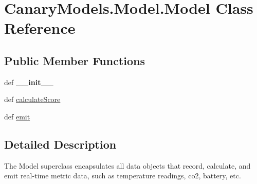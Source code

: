 \hypertarget{class_canary_models_1_1_model_1_1_model}{\section{Canary\-Models.\-Model.\-Model Class Reference}
\label{class_canary_models_1_1_model_1_1_model}
}
\subsection*{Public Member Functions}
\begin{DoxyCompactItemize}
\item 
\hypertarget{class_canary_models_1_1_model_1_1_model_a3125982406bc3fb9edd8695282c40170}{def {\bfseries \-\_\-\-\_\-init\-\_\-\-\_\-}}\label{class_canary_models_1_1_model_1_1_model_a3125982406bc3fb9edd8695282c40170}

\item 
def \hyperlink{class_canary_models_1_1_model_1_1_model_afd755af4b83ed6b3559c2ebb3272c3cf}{calculate\-Score}
\item 
def \hyperlink{class_canary_models_1_1_model_1_1_model_ad4ba832351ccfc18604c51a338a6848e}{emit}
\end{DoxyCompactItemize}


\subsection{Detailed Description}
\begin{DoxyVerb}The Model superclass encapsulates all data objects that record, calculate, and emit real-time metric data, such as temperature readings, co2, battery, etc.\end{DoxyVerb}
 

